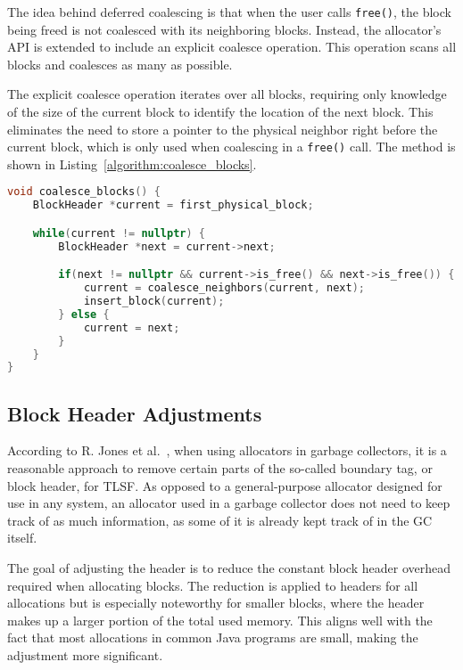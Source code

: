 The idea behind deferred coalescing is that when the user calls \texttt{free()}, the block being freed is not coalesced with its neighboring blocks. Instead, the allocator's API is extended to include an explicit coalesce operation. This operation scans all blocks and coalesces as many as possible.

The explicit coalesce operation iterates over all blocks, requiring only knowledge of the size of the current block to identify the location of the next block. This eliminates the need to store a pointer to the physical neighbor right before the current block, which is only used when coalescing in a \texttt{free()} call. The method is shown in Listing~\ref{algorithm:coalesce_blocks}.

\begin{lstlisting}[language=C++, caption={Method for explicitly coalescing all possible free blocks in the allocator. Note that coalesce\_neighbors() removes both blocks from the free-list before the newly coalesced block is inserted.}, label={algorithm:coalesce_blocks}]
void coalesce_blocks() {
    BlockHeader *current = first_physical_block;

    while(current != nullptr) {
        BlockHeader *next = current->next;

        if(next != nullptr && current->is_free() && next->is_free()) {
            current = coalesce_neighbors(current, next);
            insert_block(current);
        } else {
            current = next;
        }
    }
}
\end{lstlisting}

\subsection{Block Header Adjustments}
\label{sec:adaptations:block-header-adjustments}

According to R. Jones et al.~\cite[Page 103]{gchandbook}, when using allocators in garbage collectors, it is a reasonable approach to remove certain parts of the so-called boundary tag, or block header, for TLSF. As opposed to a general-purpose allocator designed for use in any system, an allocator used in a garbage collector does not need to keep track of as much information, as some of it is already kept track of in the GC itself.

The goal of adjusting the header is to reduce the constant block header overhead required when allocating blocks. The reduction is applied to headers for all allocations but is especially noteworthy for smaller blocks, where the header makes up a larger portion of the total used memory. This aligns well with the fact that most allocations in common Java programs are small, making the adjustment more significant.

